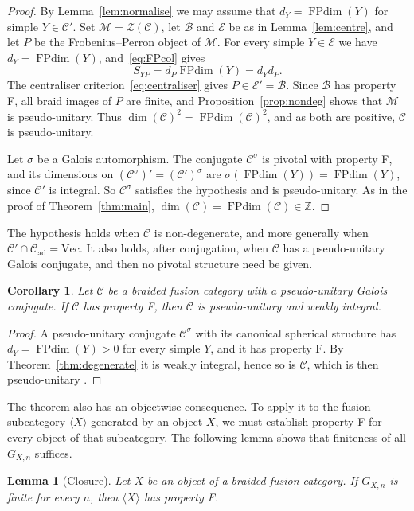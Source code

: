 \documentclass[11pt,oneside]{amsart}
\newtheorem{lemma}[theorem]{Lemma}
\newtheorem{corollary}[theorem]{Corollary}
\theoremstyle{remark}
\newcommand{\C}{\mathcal C}
\newcommand{\M}{\mathcal M}
\newcommand{\B}{\mathcal B}
\newcommand{\E}{\mathcal E}
\newcommand{\Zc}{\mathcal Z}
\newcommand{\FP}{\operatorname{FPdim}}
\newcommand{\Vect}{\mathrm{Vec}}
\newcommand{\Z}{\mathbb Z}
\newcommand{\ad}{\mathrm{ad}}
\begin{document}
\begin{proof}
By Lemma~\ref{lem:normalise} we may assume that $d_Y=\FP(Y)$ for simple
$Y\in\C'$. Set $\M=\Zc(\C)$, let $\B$ and $\E$ be as in Lemma~\ref{lem:centre},
and let $P$ be the Frobenius--Perron object of $\M$. For every simple $Y\in\E$
we have $d_Y=\FP(Y)$, and~\eqref{eq:FPcol} gives
\[
S_{YP}=d_P\FP(Y)=d_Yd_P .
\]
The centraliser criterion~\eqref{eq:centraliser} gives $P\in\E'=\B$. Since $\B$
has property F, all braid images of $P$ are finite, and
Proposition~\ref{prop:nondeg} shows that $\M$ is pseudo-unitary. Thus
$\dim(\C)^2=\FP(\C)^2$, and as both are positive, $\C$ is pseudo-unitary.

Let $\sigma$ be a Galois automorphism. The conjugate $\C^\sigma$ is pivotal
with property F, and its dimensions on $(\C^\sigma)'=(\C')^\sigma$ are
$\sigma(\FP(Y))=\FP(Y)$, since $\C'$ is integral. So $\C^\sigma$ satisfies the
hypothesis and is pseudo-unitary. As in the proof of Theorem~\ref{thm:main},
$\dim(\C)=\FP(\C)\in\Z$.
\end{proof}

The hypothesis holds when $\C$ is non-degenerate, and more generally when
$\C'\cap\C_\ad=\Vect$. It also holds, after conjugation, when $\C$ has a
pseudo-unitary Galois conjugate, and then no pivotal structure need be given.

\begin{corollary}\label{cor:pu}
Let $\C$ be a braided fusion category with a pseudo-unitary Galois conjugate.
If $\C$ has property F, then $\C$ is pseudo-unitary and weakly integral.
\end{corollary}

\begin{proof}
A pseudo-unitary conjugate $\C^\sigma$ with its canonical spherical structure
has $d_Y=\FP(Y)>0$ for every simple $Y$, and it has property F. By
Theorem~\ref{thm:degenerate} it is weakly integral, hence so is $\C$, which is
then pseudo-unitary \cite[Proposition~8.24]{ENO}.
\end{proof}

The theorem also has an objectwise consequence. To apply it to the fusion
subcategory $\langle X\rangle$ generated by an object $X$, we must establish
property F for every object of that subcategory. The following lemma shows that
finiteness of all $G_{X,n}$ suffices.

\begin{lemma}[Closure]\label{lem:closure}
Let $X$ be an object of a braided fusion category. If $G_{X,n}$ is finite for
every $n$, then $\langle X\rangle$ has property F.
\end{lemma}
\end{document}
